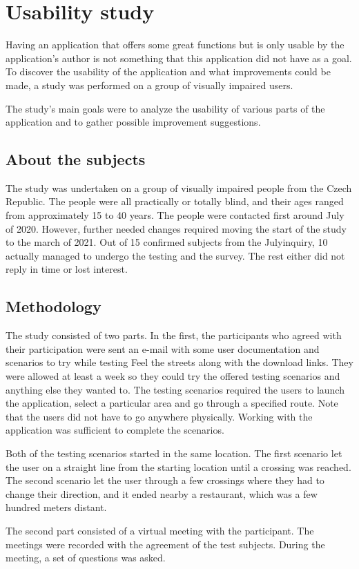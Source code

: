 \documentclass[nolof,digital]{fithesis3}
\begin{document}
\chapter{Usability study}
Having an application that offers some great functions but is only usable by the application's author is not something that this application did not have as a goal. To discover the usability of the application and what improvements could be made, a study was performed on a group of visually impaired users.

The study's main goals were to analyze the usability of various parts of the application and to gather possible improvement suggestions.
\section{About the subjects}
The study was undertaken on a group of visually impaired people from the Czech Republic. The people were all practically or totally blind, and their ages ranged from approximately 15 to 40 years. The people were contacted first around July of 2020. However, further needed changes required moving the start of the study to the march of 2021. Out of 15 confirmed subjects from the Julyinquiry, 10 actually managed to undergo the testing and the survey. The rest either did not reply in time or lost interest.
\section{Methodology}
The study consisted of two parts. In the first, the participants who agreed with their participation were sent an e-mail with some user documentation and scenarios to try while testing Feel the streets along with the download links. They were allowed at least a week so they could try the offered testing scenarios and anything else they wanted to. The testing scenarios required the users to launch the application, select a particular area and go through a specified route. Note that the users did not have to go anywhere physically. Working with the application was sufficient to complete the scenarios.

Both of the testing scenarios started in the same location. The first scenario let the user on a straight line from the starting location until a crossing was reached. The second scenario let the user through a few crossings where they had to change their direction, and it ended nearby a restaurant, which was a few hundred meters distant.

The second part consisted of a virtual meeting with the participant. The meetings were recorded with the agreement of the test subjects. During the meeting, a set of questions was asked.
\end{document}
